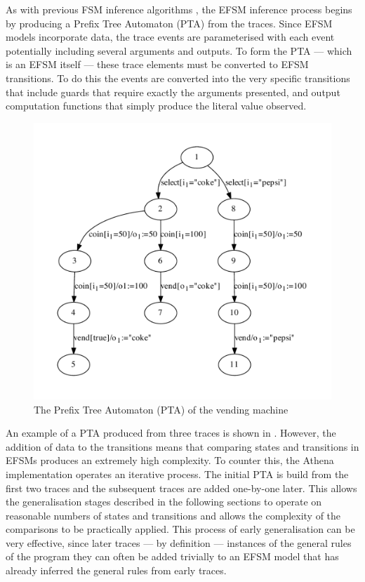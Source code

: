 As with previous FSM inference algorithms \cite{}, the EFSM inference process begins by producing a Prefix Tree Automaton (PTA) from the traces. Since EFSM models incorporate data, the trace events are parameterised with each event potentially including several arguments and outputs. To form the PTA --- which is an EFSM itself --- these trace elements must be converted to EFSM transitions. To do this the events are converted into the very specific transitions that include guards that require exactly the arguments presented, and output computation functions that simply produce the literal value observed.

\begin{figure}[h]
\begin{center}
\includegraphics[width=12cm]{figures/efsm/vend1.pdf}
\caption{The Prefix Tree Automaton (PTA) of the vending machine}
\label{fig:pta}
\end{center}
\end{figure}

An example of a PTA produced from three traces is shown in . However, the addition of data to the transitions means that comparing states and transitions in EFSMs produces an extremely high complexity. To counter this, the Athena implementation operates an iterative process. The initial PTA is build from the first two traces and the subsequent traces are added one-by-one later. This allows the generalisation stages described in the following sections to operate on reasonable numbers of states and transitions and allows the complexity of the comparisons to be practically applied. This process of early generalisation can be very effective, since later traces --- by definition --- instances of the general rules of the program they can often be added trivially to an EFSM model that has already inferred the general rules from early traces.

